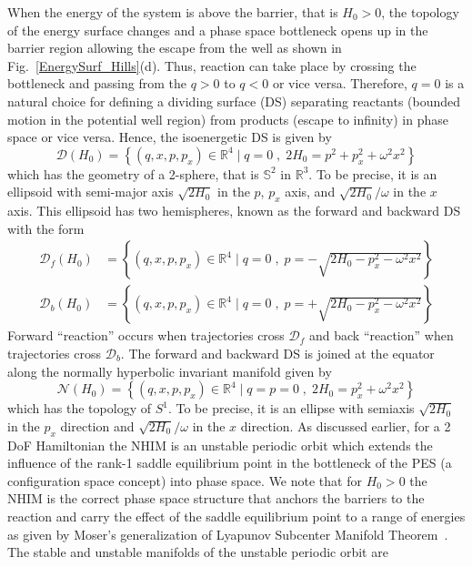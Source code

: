\documentclass{ws-ijbc}
\begin{document}
When the energy of the system is above the barrier, that is $H_0 > 0$, the topology of the energy surface changes and a phase space bottleneck opens up in the barrier region allowing the escape from the well as shown in Fig.~\ref{EnergySurf_Hills}(d). Thus, reaction can take place by crossing the bottleneck and passing from the $q > 0$ to $q < 0$ or vice versa.	Therefore, $q=0$ is a natural choice for defining a dividing surface (DS) separating reactants (bounded motion in the potential well region) from products (escape to infinity) in phase space or vice versa. Hence, the isoenergetic DS is given by
\begin{equation}
\mathcal{D}(H_0) = \left\lbrace (q,x,p,p_x) \in \mathbb{R}^4 \; | \; q = 0 \;,\; 2H_0 = p^2 + p_x^2 + \omega^2 x^2 \right\rbrace
\end{equation}
which has the geometry of a 2-sphere, that is $\mathbb{S}^2$ in $\mathbb{R}^3$. To be precise, it is an ellipsoid with semi-major axis $\sqrt{2H_0}$ in the $p$, $p_x$ axis, and $\sqrt{2H_0}/\omega$ in the $x$ axis. This ellipsoid has two hemispheres, known as the forward and backward DS with the form
\begin{equation}
\begin{split}
\mathcal{D}_f(H_0) &= \left\lbrace (q,x,p,p_x) \in \mathbb{R}^4 \; | \; q = 0 \;,\; p = -\sqrt{2H_0 -  p_x^2 - \omega^2 x^2} \right\rbrace \\
\mathcal{D}_b(H_0) &=\left\lbrace (q,x,p,p_x) \in \mathbb{R}^4 \; | \; q = 0 \;,\; p = +\sqrt{2H_0 -  p_x^2 - \omega^2 x^2} \right\rbrace
\end{split}
\end{equation}
Forward ``reaction'' occurs when trajectories cross $\mathcal{D}_f$ and back ``reaction'' when trajectories cross $\mathcal{D}_b$. The forward and backward DS is joined at the equator along the normally hyperbolic invariant manifold given by
\begin{equation}
\mathcal{N}(H_0) = \left\lbrace (q,x,p,p_x) \in \mathbb{R}^4 \; | \; q = p = 0 \;,\; 2H_0 = p_x^2 + \omega^2 x^2 \right\rbrace
\end{equation}
which has the topology of $S^1$. To be precise, it is an ellipse with semiaxis $\sqrt{2H_0}$ in the $p_x$ direction and $\sqrt{2H_0}/\omega$ in the $x$ direction. As discussed earlier, for a 2 DoF Hamiltonian the NHIM is an unstable periodic orbit which extends the influence of the rank-1 saddle equilibrium point in the bottleneck of the PES (a configuration space concept) into phase space. We note that for $H_0 > 0$ the NHIM is the correct phase space structure that anchors the barriers to the reaction and carry the effect of the saddle equilibrium point to a range of energies as given by Moser's generalization of Lyapunov Subcenter Manifold Theorem~\cite{wiggins2003applied}. The stable and unstable manifolds of the unstable periodic orbit are 
\end{document}
